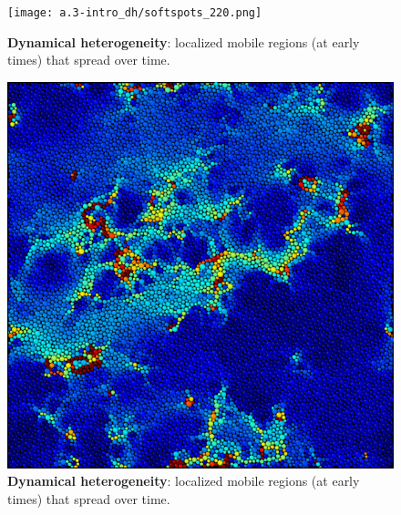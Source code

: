 \begin{frame}[c]
\begin{columns}
\begin{column}{0.5\textwidth}
\begin{figure}[t]
\begin{overprint}
\centering\texttt{[image: a.3-intro\_dh/softspots\_220.png]}
\caption{\textbf{Dynamical heterogeneity}: localized mobile regions (at early times) that spread over time.}  

\centering\includegraphics[height=0.6\textheight]{intro_glassy/softspots_280.png}
\caption{\textbf{Dynamical heterogeneity}: localized mobile regions (at early times) that spread over time.}  
\end{overprint}

\end{figure}






\end{column}
\end{columns}
\end{frame}
